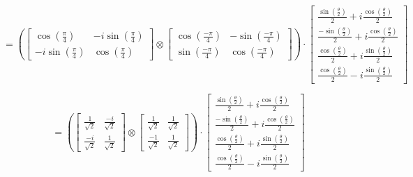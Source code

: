 \documentclass{article}
\begin{document}
\begin{itemize}
	      \[
		      =
		      \left(
		      \begin{bmatrix}
				      \cos \left(\frac{\pi}{4}\right)    & -i \sin \left(\frac{\pi}{4}\right) \\
				      -i \sin \left(\frac{\pi}{4}\right) & \cos \left(\frac{\pi}{4}\right)
			      \end{bmatrix}
		      \otimes
		      \begin{bmatrix}
				      \cos \left(\frac{-\pi}{4}\right) & - \sin \left(\frac{-\pi}{4}\right) \\
				      \sin \left(\frac{-\pi}{4}\right) & \cos \left(\frac{-\pi}{4}\right)
			      \end{bmatrix}
		      \right)
		      \cdot
		      \begin{bmatrix}
			      \frac{\sin \left(\frac{\theta}{2}\right)}{2} + i \frac{\cos \left(\frac{\theta}{2}\right)}{2}  \\
			      \frac{-\sin \left(\frac{\theta}{2}\right)}{2} + i \frac{\cos \left(\frac{\theta}{2}\right)}{2} \\
			      \frac{\cos \left(\frac{\theta}{2}\right)}{2} + i \frac{\sin \left(\frac{\theta}{2}\right)}{2}  \\
			      \frac{\cos \left(\frac{\theta}{2}\right)}{2} - i \frac{\sin \left(\frac{\theta}{2}\right)}{2}
		      \end{bmatrix}
	      \]

	      \[
		      =
		      \left(
		      \begin{bmatrix}
				      \frac{1}{\sqrt{2}}  & \frac{-i}{\sqrt{2}} \\
				      \frac{-i}{\sqrt{2}} & \frac{1}{\sqrt{2}}
			      \end{bmatrix}
		      \otimes
		      \begin{bmatrix}
				      \frac{1}{\sqrt{2}}  & \frac{1}{\sqrt{2}} \\
				      \frac{-1}{\sqrt{2}} & \frac{1}{\sqrt{2}}
			      \end{bmatrix}
		      \right)
		      \cdot
		      \begin{bmatrix}
			      \frac{\sin \left(\frac{\theta}{2}\right)}{2} + i \frac{\cos \left(\frac{\theta}{2}\right)}{2}  \\
			      \frac{-\sin \left(\frac{\theta}{2}\right)}{2} + i \frac{\cos \left(\frac{\theta}{2}\right)}{2} \\
			      \frac{\cos \left(\frac{\theta}{2}\right)}{2} + i \frac{\sin \left(\frac{\theta}{2}\right)}{2}  \\
			      \frac{\cos \left(\frac{\theta}{2}\right)}{2} - i \frac{\sin \left(\frac{\theta}{2}\right)}{2}
		      \end{bmatrix}
	      \]


\end{itemize}
\end{document}

